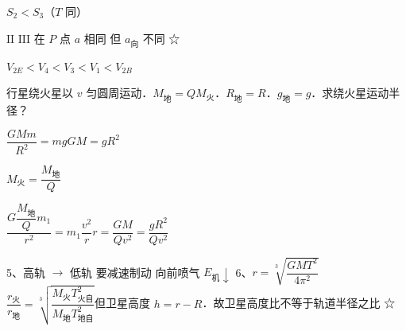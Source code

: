 
$S_2<S_3$（$T$ 同）

$\mathrm{II}$ $\mathrm{III}$ 在 $P$ 点 $a$ 相同 但 $a_{\text{向}}$ 不同 ☆%

$V_{2E}<V_4<V_3<V_1<V_{2B}$
\begin{problem}[3]
行星绕火星以 $v$ 匀圆周运动．$M_{\text{地}}=QM_{\text{火}}$．$R_{\text{地}}=R$．$g_{\text{地}}=g$．求绕火星运动半径？
\begin{solution}
$\dfrac{GMm}{R^2}=mg$\quad $GM=gR^2$

$M_{\text{火}}=\dfrac{M_{\text{地}}}{Q}$

$\dfrac{G\dfrac{M_{\text{地}}}{Q}m_1}{r^2}=m_1\dfrac{v^2}{r}$\quad $r=\dfrac{GM}{Qv^2}=\dfrac{gR^2}{Qv^2}$
\end{solution}
\end{problem}
5、高轨 $\to$ 低轨 要减速制动 向前喷气 $E_{\text{机}}\downarrow$%
6、$r=\sqrt[3]{\dfrac{GMT^2}{4\pi^2}}$\quad $\dfrac{r_{\text{火}}}{r_{\text{地}}}=\sqrt[3]{\dfrac{M_{\text{火}}T_{\text{火自}}^{2}}{M_{\text{地}}T_{\text{地自}}^{2}}}$\quad 但卫星高度 $h=r-R$．故卫星高度比不等于轨道半径之比 ☆%

